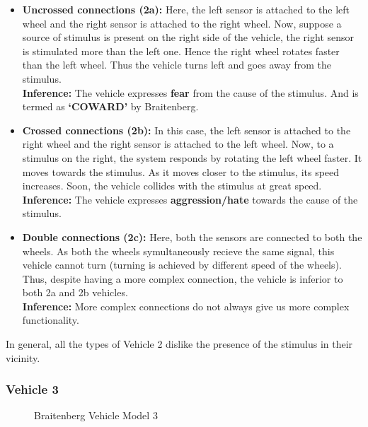         \begin{itemize}
            \item \textbf{Uncrossed connections (2a):} Here, the left sensor is attached to the left wheel and the right sensor is attached to the right wheel. Now, suppose a source of stimulus is present on the right side of the vehicle, the right sensor is stimulated more than the left one. Hence the right wheel rotates faster than the left wheel. Thus the vehicle turns left and goes away from the stimulus.\\
            \textbf{Inference:} The vehicle expresses \textbf{fear} from the cause of the stimulus. And is termed as \textbf{`COWARD'} by Braitenberg.
            \item \textbf{Crossed connections (2b):} In this case, the left sensor is attached to the right wheel and the right sensor is attached to the left wheel. Now, to a stimulus on the right, the system responds by rotating the left wheel faster. It moves towards the stimulus. As it moves closer to the stimulus, its speed increases. Soon, the vehicle collides with the stimulus at great speed.\\
            \textbf{Inference:} The vehicle expresses \textbf{aggression/hate} towards the cause of the stimulus.
            \item \textbf{Double connections (2c):} Here, both the sensors are connected to both the wheels. As both the wheels symultaneously recieve the same signal, this vehicle cannot turn (turning is achieved by different speed of the wheels). Thus, despite having a more complex connection, the vehicle is inferior to both 2a and 2b vehicles.\\
            \textbf{Inference:} More complex connections do not always give us more complex functionality.
        \end{itemize}

        In general, all the types of Vehicle 2 dislike the presence of the stimulus in their vicinity.

    \subsubsection{Vehicle 3}
    \label{sec:Vehicle_3}

    \begin{figure}[t]%
        \centering
        \qquad
        \caption{Braitenberg Vehicle Model 3}%
        \label{fig:vehicle3}%
    \end{figure}


